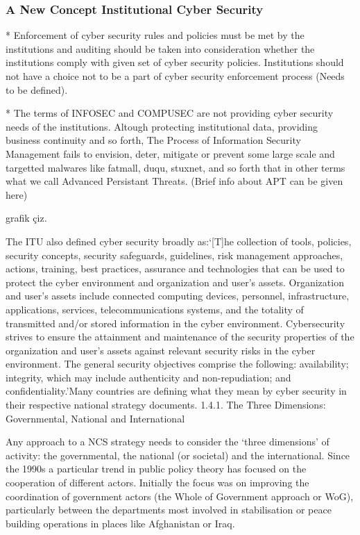 \documentclass[journal]{IEEEtran}
\begin{document}
\subsubsection{A New Concept Institutional Cyber Security}

* Enforcement of cyber security rules and policies must be met by the institutions and auditing should be taken into consideration whether the  institutions comply with given set of cyber security policies.  Institutions should not have a choice not to be a part of cyber security enforcement process (Needs to be defined).

* The terms of INFOSEC and COMPUSEC are not providing cyber security needs of the institutions. Altough protecting institutional data, providing business continuity and so forth, The Process of Information Security Management  fails to envision, deter, mitigate or prevent some large scale and targetted malwares like fatmall, duqu, stuxnet, and so forth that in other terms what we call Advanced Persistant Threats. (Brief info about APT can be given here)

grafik çiz.

The ITU also defined cyber security broadly as:‘[T]he collection of tools, policies, security concepts, security safeguards, guidelines, risk management approaches, actions, training, best practices, assurance and technologies that can be used to protect the cyber environment and organization and user’s assets. Organization and user’s assets include connected computing devices, personnel, infrastructure, applications, services, telecommunications systems, and the totality of transmitted and/or stored information in the cyber environment. Cybersecurity strives to ensure the attainment and maintenance of the security properties of the organization and user’s assets against relevant security risks in the cyber environment. The general security objectives comprise the following: availability; integrity, which may include authenticity and non-repudiation; and confidentiality.’Many countries are defining what they mean by cyber security in their respective national strategy documents.
\cite{kurt2012cyber}
1.4.1. The Three Dimensions: Governmental, National and  International

Any approach to a NCS strategy needs to consider the ‘three dimensions’ of activity:
the governmental, the national (or societal) and the international. Since the 1990s a
particular trend in public policy theory has focused on the cooperation of different
actors. Initially the focus was on improving the coordination of government
actors (the Whole of Government approach or WoG), particularly between the
departments most involved in stabilisation or peace building operations in places like Afghanistan or Iraq.
\\
\end{document}

